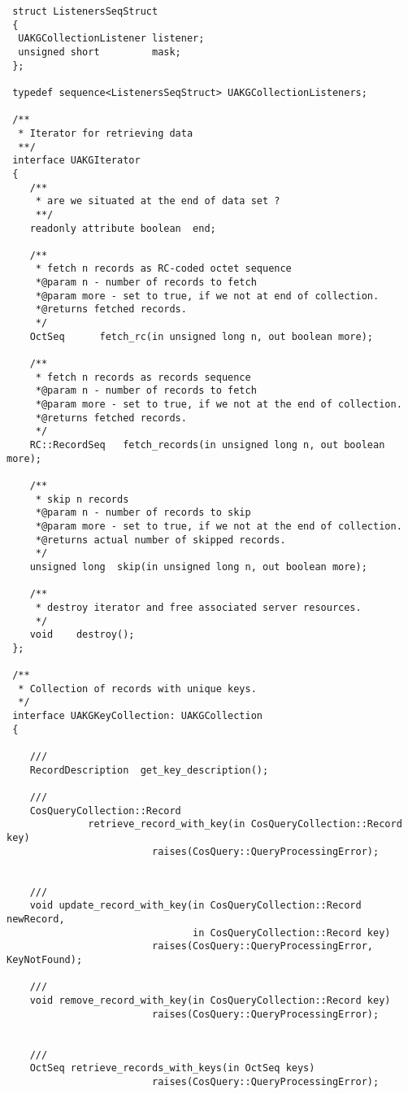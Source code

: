 \documentclass[10pt]{article}
\begin{document}
\begin{verbatim}
 struct ListenersSeqStruct
 {
  UAKGCollectionListener listener;
  unsigned short         mask;
 };

 typedef sequence<ListenersSeqStruct> UAKGCollectionListeners;
 
 /**
  * Iterator for retrieving data
  **/
 interface UAKGIterator
 {
    /**
     * are we situated at the end of data set ?
     **/
    readonly attribute boolean  end;
    
    /**
     * fetch n records as RC-coded octet sequence
     *@param n - number of records to fetch
     *@param more - set to true, if we not at end of collection.
     *@returns fetched records.
     */
    OctSeq      fetch_rc(in unsigned long n, out boolean more);

    /**
     * fetch n records as records sequence
     *@param n - number of records to fetch
     *@param more - set to true, if we not at the end of collection.
     *@returns fetched records.
     */
    RC::RecordSeq   fetch_records(in unsigned long n, out boolean more);

    /**
     * skip n records 
     *@param n - number of records to skip
     *@param more - set to true, if we not at the end of collection.
     *@returns actual number of skipped records.
     */
    unsigned long  skip(in unsigned long n, out boolean more);

    /**
     * destroy iterator and free associated server resources.
     */
    void	destroy();
 };

 /**
  * Collection of records with unique keys.
  */
 interface UAKGKeyCollection: UAKGCollection
 {

    ///
    RecordDescription  get_key_description();

    ///
    CosQueryCollection::Record  
              retrieve_record_with_key(in CosQueryCollection::Record key)
                         raises(CosQuery::QueryProcessingError);
                                

    ///
    void update_record_with_key(in CosQueryCollection::Record newRecord,
                                in CosQueryCollection::Record key)
                         raises(CosQuery::QueryProcessingError, KeyNotFound);

    ///
    void remove_record_with_key(in CosQueryCollection::Record key)
                         raises(CosQuery::QueryProcessingError);


    ///
    OctSeq retrieve_records_with_keys(in OctSeq keys)
                         raises(CosQuery::QueryProcessingError);


\end{verbatim}
\end{document}
